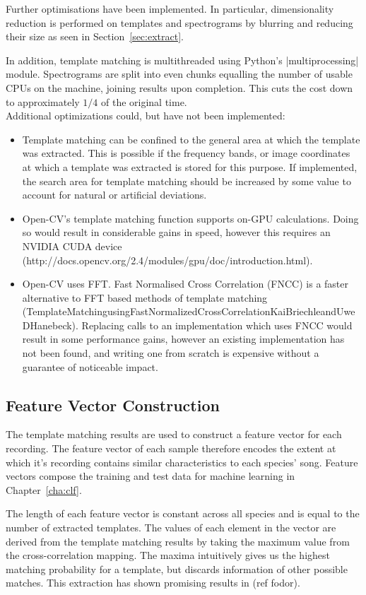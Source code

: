 Further optimisations have been implemented.
In particular, dimensionality reduction is performed on templates and
spectrograms by blurring and reducing their size as seen in
Section~\ref{sec:extract}.

In addition, template matching is multithreaded using Python's |multiprocessing|
module.
Spectrograms are split into even chunks equalling the number of usable CPUs on
the machine, joining results upon completion.
This cuts the cost down to approximately $1/4$ of the original time.\\

Additional optimizations could, but have not been implemented:
\begin{itemize}[noitemsep]
  \item Template matching can be confined to the general area at which the template
    was extracted.
    This is possible if the frequency bands, or image coordinates at which a
    template was extracted is stored for this purpose.
    If implemented, the search area for template matching should be increased by some
    value to account for natural or artificial deviations.

  \item Open-CV's template matching function supports on-GPU calculations.
    Doing so would result in considerable gains in speed, however this requires
    an NVIDIA CUDA device (http://docs.opencv.org/2.4/modules/gpu/doc/introduction.html).

  \item Open-CV uses FFT.
    Fast Normalised Cross Correlation (FNCC) is a faster alternative to FFT based
    methods of template matching (TemplateMatchingusingFastNormalizedCrossCorrelationKaiBriechleandUweDHanebeck).
    Replacing calls to an implementation which uses FNCC would result in some 
    performance gains, however an existing implementation has not been found,
    and writing one from scratch is expensive without a guarantee of noticeable
    impact.
\end{itemize}

\subsection{Feature Vector Construction}
The template matching results are used to construct a feature vector for each
recording.
The feature vector of each sample therefore encodes the extent at which it's
recording contains similar characteristics to each species' song.
Feature vectors compose the training and test data for machine learning in
Chapter~\ref{cha:clf}.

The length of each feature vector is constant across all species and is equal to
the number of extracted templates.
The values of each element in the vector are derived from the template matching
results by taking the maximum value from the cross-correlation mapping.
The maxima intuitively gives us the highest matching probability for a template,
but discards information of other possible matches.
This extraction has shown promising results in (ref fodor).
